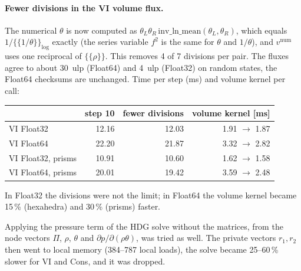 \documentclass[11pt,a4paper]{article}
\begin{document}
\paragraph{Fewer divisions in the VI volume flux.} The numerical
$\theta$ is now computed as $\theta_L\theta_R\,\mathrm{inv\_ln\_mean}(\theta_L,\theta_R)$,
which equals $1/\{\!\{1/\theta\}\!\}_{\log}$ exactly (the series variable
$f^2$ is the same for $\theta$ and $1/\theta$), and $v^\text{num}$ uses one
reciprocal of $\{\!\{\rho\}\!\}$. This removes 4 of 7 divisions per
pair. The fluxes agree to about 30~ulp (Float64) and 4~ulp (Float32) on
random states, the Float64 checksums are unchanged. Time per step (ms) and
volume kernel per call:
\begin{center}
\small
\begin{tabular}{lrrr}
\toprule
 & step 10 & fewer divisions & volume kernel [ms] \\
\midrule
VI Float32          & 12.16 & 12.03 & 1.91 $\to$ 1.87 \\
VI Float64          & 22.20 & 21.87 & 3.32 $\to$ 2.82 \\
VI Float32, prisms  & 10.91 & 10.60 & 1.62 $\to$ 1.58 \\
VI Float64, prisms  & 20.01 & 19.42 & 3.59 $\to$ 2.48 \\
\bottomrule
\end{tabular}
\end{center}
In Float32 the divisions were not the limit; in Float64 the volume kernel
became 15\,\% (hexahedra) and 30\,\% (prisms) faster.

Applying the pressure term of the HDG solve without the matrices, from
the node vectors $\Pi$, $\rho$, $\theta$ and $\partial p/\partial(\rho\theta)$,
was tried as well. The private vectors $r_1, r_2$ then went to local
memory (384--787 local loads), the solve became 25--60\,\% slower for VI and
Cons, and it was dropped.
\end{document}
